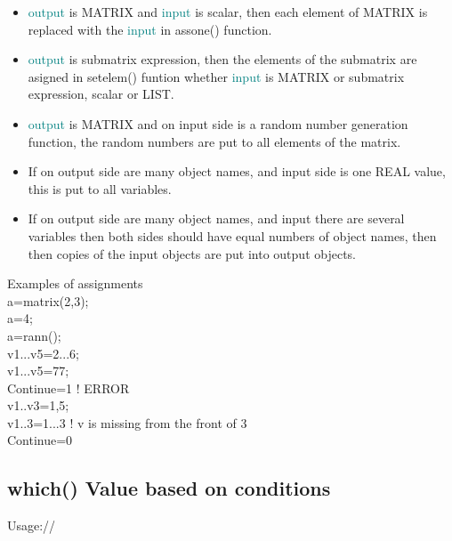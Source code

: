 \begin{itemize}
\item  \textcolor{teal}{output} is MATRIX
and \textcolor{teal}{input} is scalar, then each element of MATRIX is replaced with the \textcolor{teal}{input}
in \textcolor{VioletRed}{assone}() function.
\item  \textcolor{teal}{output} is submatrix expression, then the elements of the
submatrix are asigned in \textcolor{VioletRed}{setelem}() funtion whether \textcolor{teal}{input} is MATRIX or submatrix
expression, scalar or LIST.

\item  \textcolor{teal}{output} is MATRIX  and on input side is a random number
generation function, the random numbers are put to all elements of the matrix.

\item If on output side are many object names, and input side is
one REAL value, this is put to all variables.

\item If on output side are many object names, and input there are several
variables then both sides should have equal numbers of object names, then
then copies of the input objects are put into output objects.


\end{itemize}
\begin{example}[assignex]Examples of assignments\\
\label{assignex}
a=\textcolor{VioletRed}{matrix}(2,3);\\
a=4;\\
a=\textcolor{VioletRed}{rann}();\\
v1...v5=2...6;\\
v1...v5=77;\\
Continue=1  ! ERROR\\
v1..v3=1,5;\\
v1..3=1...3   ! v is missing from the front of 3\\
Continue=0
\end{example}
\subsection{\textcolor{VioletRed}{which}() Value based on conditions}
\label{which}

Usage://

